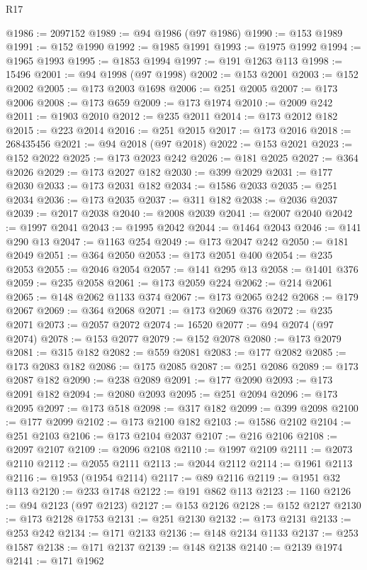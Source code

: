 \begin{lexlean}{R17}
\begin{coremodule}
@1986 := 2097152
@1989 := @94 @1986 (@97 @1986)
@1990 := @153 @1989
@1991 := @152 @1990
@1992 := @1985 @1991
@1993 := @1975 @1992
@1994 := @1965 @1993
@1995 := @1853 @1994
@1997 := @191 @1263 @113
@1998 := 15496
@2001 := @94 @1998 (@97 @1998)
@2002 := @153 @2001
@2003 := @152 @2002
@2005 := @173 @2003 @1698
@2006 := @251 @2005
@2007 := @173 @2006
@2008 := @173 @659
@2009 := @173 @1974
@2010 := @2009 @242
@2011 := @1903 @2010
@2012 := @235 @2011
@2014 := @173 @2012 @182
@2015 := @223 @2014
@2016 := @251 @2015
@2017 := @173 @2016
@2018 := 268435456
@2021 := @94 @2018 (@97 @2018)
@2022 := @153 @2021
@2023 := @152 @2022
@2025 := @173 @2023 @242
@2026 := @181 @2025
@2027 := @364 @2026
@2029 := @173 @2027 @182
@2030 := @399 @2029
@2031 := @177 @2030
@2033 := @173 @2031 @182
@2034 := @1586 @2033
@2035 := @251 @2034
@2036 := @173 @2035
@2037 := @311 @182
@2038 := @2036 @2037
@2039 := @2017 @2038
@2040 := @2008 @2039
@2041 := @2007 @2040
@2042 := @1997 @2041
@2043 := @1995 @2042
@2044 := @1464 @2043
@2046 := @141 @290 @13
@2047 := @1163 @254
@2049 := @173 @2047 @242
@2050 := @181 @2049
@2051 := @364 @2050
@2053 := @173 @2051 @400
@2054 := @235 @2053
@2055 := @2046 @2054
@2057 := @141 @295 @13
@2058 := @1401 @376
@2059 := @235 @2058
@2061 := @173 @2059 @224
@2062 := @214 @2061
@2065 := @148 @2062 @1133 @374
@2067 := @173 @2065 @242
@2068 := @179 @2067
@2069 := @364 @2068
@2071 := @173 @2069 @376
@2072 := @235 @2071
@2073 := @2057 @2072
@2074 := 16520
@2077 := @94 @2074 (@97 @2074)
@2078 := @153 @2077
@2079 := @152 @2078
@2080 := @173 @2079
@2081 := @315 @182
@2082 := @559 @2081
@2083 := @177 @2082
@2085 := @173 @2083 @182
@2086 := @175 @2085
@2087 := @251 @2086
@2089 := @173 @2087 @182
@2090 := @238 @2089
@2091 := @177 @2090
@2093 := @173 @2091 @182
@2094 := @2080 @2093
@2095 := @251 @2094
@2096 := @173 @2095
@2097 := @173 @518
@2098 := @317 @182
@2099 := @399 @2098
@2100 := @177 @2099
@2102 := @173 @2100 @182
@2103 := @1586 @2102
@2104 := @251 @2103
@2106 := @173 @2104 @2037
@2107 := @216 @2106
@2108 := @2097 @2107
@2109 := @2096 @2108
@2110 := @1997 @2109
@2111 := @2073 @2110
@2112 := @2055 @2111
@2113 := @2044 @2112
@2114 := @1961 @2113
@2116 := @1953 (@1954 @2114)
@2117 := @89 @2116
@2119 := @1951 @32 @113
@2120 := @233 @1748
@2122 := @191 @862 @113
@2123 := 1160
@2126 := @94 @2123 (@97 @2123)
@2127 := @153 @2126
@2128 := @152 @2127
@2130 := @173 @2128 @1753
@2131 := @251 @2130
@2132 := @173 @2131
@2133 := @253 @242
@2134 := @171 @2133
@2136 := @148 @2134 @1133
@2137 := @253 @1587
@2138 := @171 @2137
@2139 := @148 @2138
@2140 := @2139 @1974
@2141 := @171 @1962

\end{coremodule}
\end{lexlean}
